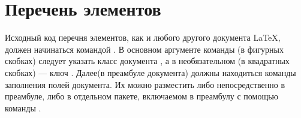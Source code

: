 
\section{Перечень элементов}

Исходный код перечня элементов, как и любого другого документа \LaTeX{}, должен
начинаться командой . В основном аргументе команды%
(в фигурных скобках) следует указать класс документа , а в необязательном%
(в квадратных скобках) --- ключ . Далее(в преамбуле документа)
должны находиться команды заполнения полей документа. Их можно разместить либо
непосредственно в преамбуле, либо в отдельном пакете, включаемом в преамбулу с помощью
команды .
